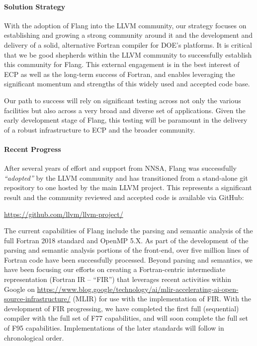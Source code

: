 \paragraph{Solution Strategy}

With the adoption of Flang into the LLVM community, our strategy
focuses on establishing and growing a strong community around it and the development
and delivery of a solid, alternative Fortran compiler for DOE's
platforms.  It is critical that we be good shepherds within
the LLVM community to successfully establish this community for Flang.
This external engagement is in the best interest
of ECP as well as the long-term success of Fortran, and enables leveraging
the significant momentum and strengths of this widely used and accepted
code base. 

Our path to success will rely on significant testing across not only
the various facilities but also across a very broad and diverse set of
applications. Given the early development stage of Flang, this testing
will be paramount in the delivery of a robust infrastructure to ECP
and the broader community.

\paragraph{Recent Progress}

After several years of effort and support from NNSA, Flang was 
successfully \emph{``adopted''} by the LLVM community and has transitioned 
from a stand-alone git repository to one hosted by the main LLVM project.  This 
represents a significant result and the community reviewed and accepted code is
available via GitHub:

\begin{center}
\url{https://github.com/llvm/llvm-project/}
\end{center}

The current capabilities of Flang include the parsing and semantic
analysis of the full Fortran 2018 standard and OpenMP 5.X. As part of the
development of the parsing and semantic analysis portions of the
front-end, over five million lines of Fortran code have been
successfully processed. Beyond parsing and semantics, we have been
focusing our efforts on creating a Fortran-centric intermediate
representation (Fortran IR -- ``FIR'') that leverages recent activities
within Google on 
\href{Multi-Level Intermediate Representations} 
{https://www.blog.google/technology/ai/mlir-accelerating-ai-open-source-infrastructure/}
(MLIR) for use with the implementation of FIR.
With the development of FIR progressing, we have completed
the first full (sequential) compiler with the full set of F77 
capabilities, and will soon complete the full set of F95 capabilities.
Implementations of the later standards will follow in chronological order.

